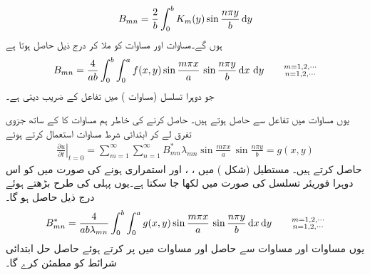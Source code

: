 \begin{align}\label{مساوات_جزوی_دوہرا_فوریئر_تسلسل_ٹ}
B_{mn}=\frac{2}{b}\int_0^b K_m(y)\sin \frac{n\pi y}{b}\dif y
\end{align}
ہوں گے۔مساوات  اور مساوات  کو ملا کر درج ذیل  حاصل ہوتا ہے
\begin{align}\label{مساوات_جزوی_دوہرا_فوریئر_تسلسل_ث}
B_{mn}=\frac{4}{ab}\int_0^b\int_0^a f(x,y)\sin\frac{m\pi x}{a}\,\sin \frac{n\pi y}{b} \dif x\,\dif y\quad \quad \substack{m=1,2,\cdots\\n=1,2,\cdots}
\end{align}
جو دوہرا تسلسل (مساوات ) میں تفاعل  کے  ضریب   دیتی ہے۔

یوں مساوات  میں  تفاعل  سے حاصل ہوتے ہیں۔  حاصل کرنے کی خاطر ہم مساوات  کا  کے ساتھ جزوی تفرق لے کر ابتدائی شرط مساوات  استعمال کرتے ہوئے  
\begin{align*}
\left.\frac{\partial u}{\partial t}\right|_{t=0}=\sum_{m=1}^{\infty}\sum_{n=1}^{\infty} B^*_{mn}\lambda_{mn}\sin\frac{m\pi x}{a}\,\sin\frac{n\pi y}{b}=g(x,y)
\end{align*}
حاصل کرتے ہیں۔ مستطیل  (شکل ) میں ، ،  اور   استمراری ہونے کی صورت میں  کو اس دوہرا فوریئر تسلسل کی صورت میں لکھا جا سکتا ہے۔یوں پہلی کی طرح بڑھتے ہوئے درج ذیل حاصل ہو گا۔
\begin{align}\label{مساوات_جزوی_دوہرا_فوریئر_تسلسل_ج}
B^*_{mn}=\frac{4}{ab\lambda_{mn}}\int_0^b\int_0^a g(x,y) \sin\frac{m\pi x}{a}\,\sin \frac{n\pi y}{b}\dif x\dif y\quad \quad \substack{m=1,2,\cdots\\n=1,2,\cdots}
\end{align}
یوں مساوات  اور مساوات  سے حاصل  اور    مساوات  میں پر کرتے ہوئے حاصل حل ابتدائی شرائط کو مطمئن کرے گا۔


